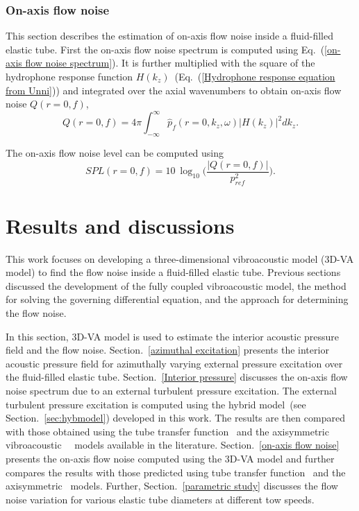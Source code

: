\documentclass[twocolumn,10pt]{asme2ej}
\begin{document}
\subsubsection{On-axis flow noise}
This section describes the estimation of on-axis flow noise inside a fluid-filled elastic tube. First the on-axis flow noise spectrum is computed using Eq.~(\ref{on-axis flow noise spectrum}). It is further multiplied with the square of the hydrophone response function $H(k_z)$~(Eq.~(\ref{Hydrophone response equation from Unni})) and integrated over the axial wavenumbers to obtain on-axis flow noise $Q(r=0,f)$,
\begin{equation}\label{on axis flow noise equation}
    Q(r=0,f) =  4\pi\int_{-\infty}^{\infty} \hat{p}_f(r=0,k_z,\omega)|H(k_z)|^2dk_z.
\end{equation}

The on-axis flow noise level can be computed using
\begin{equation}\label{spl on-axis flow noise}
    SPL(r=0,f) = 10~\log_{10}\bigg(\frac{|Q(r=0,f)|}{p_{ref}^2}\bigg).
\end{equation}

\section{Results and discussions}\label{sec:results}
This work focuses on developing a three-dimensional vibroacoustic model (3D-VA model) to find the flow noise inside a fluid-filled elastic tube. Previous sections discussed the development of the fully coupled vibroacoustic model, the method for solving the governing differential equation, and the approach for determining the flow noise. 

In this section, 3D-VA model is used to estimate the interior acoustic pressure field and the flow noise. Section.~\ref{azimuthal excitation} presents the interior acoustic pressure field for azimuthally varying external pressure excitation over the fluid-filled elastic tube. Section.~\ref{Interior pressure} discusses the on-axis flow noise spectrum due to an external turbulent pressure excitation. The external turbulent pressure excitation is computed using the hybrid model~(see Section.~\ref{sec:hybmodel}) developed in this work. The results are then compared with those obtained using the tube transfer function~\cite{knight1996} and the axisymmetric vibroacoustic~\cite{jineesh2013}~\cite{Rakesh2024} models available in the literature. Section.~\ref{on-axis flow noise} presents the on-axis flow noise computed using the 3D-VA model and further compares the results with those predicted using tube transfer function~\cite{knight1996} and the axisymmetric~\cite{jineesh2013} models. Further, Section.~\ref{parametric study} discusses the flow noise variation for various elastic tube diameters at different tow speeds.
\end{document}

